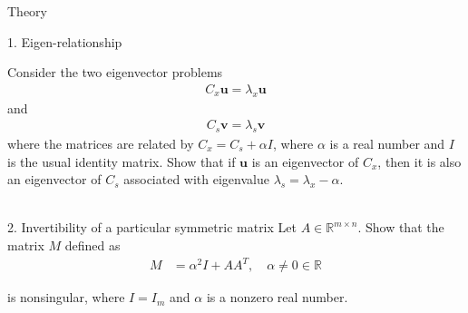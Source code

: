 \begin{section}{Theory}

\begin{homeworkSection}{1. Eigen-relationship}

Consider the two eigenvector problems
\begin{align*}
	C_x \bm{u} = \lambda_x \bm{u}
\end{align*}
and
\begin{align*}
	C_s \bm{v} = \lambda_s \bm{v}
\end{align*}
where the matrices are related by $C_x = C_s + \alpha I$, where $\alpha$ is a real number and $I$ is the usual identity matrix. Show that if $\bm{u}$ is an eigenvector of $C_x$, then it is also an eigenvector of $C_s$ associated with eigenvalue $\lambda_s = \lambda_x -\alpha$.
\\
\\

\end{homeworkSection}

\begin{homeworkSection}{2. Invertibility of a particular symmetric matrix}
Let $A \in \mathbb{R}^{m \times n}$. Show that the matrix $M$ defined as
\begin{align*}
	M &= \alpha^2 I + AA^T, \quad  \alpha \neq 0 \in \mathbb{R}
\end{align*}

is nonsingular, where $I = I_m$ and $\alpha$ is a nonzero real number.
\\
\\


\end{homeworkSection}
\end{section}
